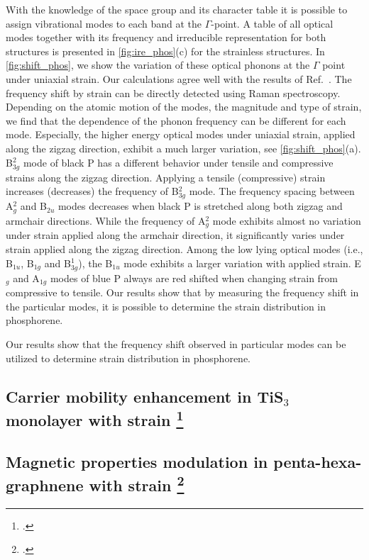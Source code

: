 With the knowledge of the space group and its character table it is possible to assign vibrational modes to each band at the $\Gamma$-point. A table of all optical modes together with its frequency and irreducible representation for both structures is presented in \autoref{fig:ire_phos}(c) for the strainless structures. In \autoref{fig:shift_phos}, we show the variation of these optical phonons at the $\Gamma$ point under uniaxial strain. Our calculations agree well with the results of Ref.~\cite{phonon-blackP-1}. The frequency shift by strain can be directly detected using Raman spectroscopy. 
Depending on the atomic motion of the modes, the magnitude and type of strain, we find that the dependence of the phonon frequency can be different for each mode. Especially, the higher energy optical modes under uniaxial strain, applied along the zigzag direction, exhibit a much larger variation, see \autoref{fig:shift_phos}(a). B$^2_{3g}$ mode of black P has a different behavior under tensile and compressive strains along the zigzag direction. Applying a tensile (compressive) strain increases (decreases) the frequency of B$^2_{3g}$ mode. The frequency spacing between A$^2_{g}$ and B$_{2u}$ modes decreases when black P is stretched along both zigzag and armchair directions. While  the frequency of A$^2_{g}$ mode exhibits almost no variation under strain applied along the armchair direction,  it significantly varies under  strain applied along the zigzag direction.
Among the low lying optical modes (i.e., B$_{1u}$, B$_{1g}$ and B$^1_{3g}$), the B$_{1u}$ mode exhibits a larger variation with applied strain. 
E$_g$ and A$_{1g}$ modes of blue P always are red shifted when changing strain from compressive to tensile. Our results show that by measuring the frequency shift in the particular modes, it is possible to determine the
strain distribution in phosphorene.  

Our results show that the frequency shift observed in particular modes can be utilized to determine strain distribution in phosphorene.

\subsection[Carrier mobility enhancement in TiS$_3$ monolayer with strain]{Carrier mobility enhancement in TiS$_3$ monolayer with strain \footcite[This work is published in:][]{Aierken2016.mobility}}
\subsection[Magnetic properties modulation in penta-hexa-graphnene with strain]{Magnetic properties modulation in penta-hexa-graphnene with strain \footcite[This work is published in:][]{Aierken2016.magnetism}}


